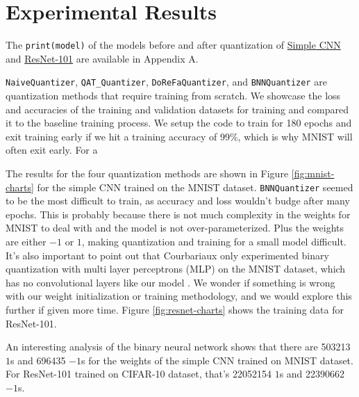\documentclass{article}
\begin{document}
\section{Experimental Results}

The \verb|print(model)| of the models before and after quantization of \hyperref[sec:A1]{Simple CNN} and \hyperref[sec:A2]{ResNet-101} are available in Appendix A.

\verb|NaiveQuantizer|, \verb|QAT_Quantizer|, \verb|DoReFaQuantizer|, and \verb|BNNQuantizer| are quantization methods that require training from scratch. We showcase the loss and accuracies of the training and validation datasets for training and compared it to the baseline training process. We setup the code to train for 180 epochs and exit training early if we hit a training accuracy of 99\%, which is why MNIST will often exit early. For a

The results for the four quantization methods are shown in Figure \ref{fig:mnist-charts} for the simple CNN trained on the MNIST dataset. \verb|BNNQuantizer| seemed to be the most difficult to train, as accuracy and loss wouldn't budge after many epochs. This is probably because there is not much complexity in the weights for MNIST to deal with and the model is not over-parameterized. Plus the weights are either $-1$ or $1$, making quantization and training for a small model difficult. It's also important to point out that Courbariaux only experimented binary quantization with multi layer perceptrons (MLP) on the MNIST dataset, which has no convolutional layers like our model \cite{binarynn}. We wonder if something is wrong with our weight initialization or training methodology, and we would explore this further if given more time. Figure \ref{fig:resnet-charts} shows the training data for ResNet-101.

An interesting analysis of the binary neural network shows that there are 503213 $1$s and 696435 $-1$s for the weights of the simple CNN trained on MNIST dataset. For ResNet-101 trained on CIFAR-10 dataset, that's 22052154 $1$s and 22390662 $-1$s.
\end{document}
